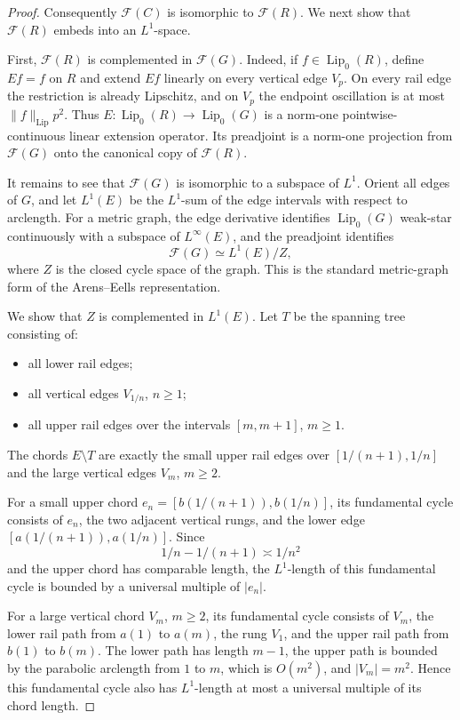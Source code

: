 \documentclass[11pt]{article}
\newcommand{\F}{\mathcal F}
\newcommand{\Lip}{\operatorname{Lip}}
\begin{document}
\begin{proof}
Consequently \(\F(C)\) is isomorphic to \(\F(R)\).  We next show that \(\F(R)\) embeds into an \(L^1\)-space.

First, \(\F(R)\) is complemented in \(\F(G)\).  Indeed, if \(f\in\Lip_0(R)\), define \(Ef=f\) on \(R\) and extend \(Ef\) linearly on every vertical edge \(V_p\).  On every rail edge the restriction is already Lipschitz, and on \(V_p\) the endpoint oscillation is at most \(\|f\|_{\Lip}p^2\).  Thus \(E:\Lip_0(R)\to \Lip_0(G)\) is a norm-one pointwise-continuous linear extension operator.  Its preadjoint is a norm-one projection from \(\F(G)\) onto the canonical copy of \(\F(R)\).

It remains to see that \(\F(G)\) is isomorphic to a subspace of \(L^1\).  Orient all edges of \(G\), and let \(L^1(E)\) be the \(L^1\)-sum of the edge intervals with respect to arclength.  For a metric graph, the edge derivative identifies \(\Lip_0(G)\) weak-star continuously with a subspace of \(L^\infty(E)\), and the preadjoint identifies
\[
 \F(G)\simeq L^1(E)/Z,
\]
where \(Z\) is the closed cycle space of the graph.  This is the standard metric-graph form of the Arens--Eells representation.

We show that \(Z\) is complemented in \(L^1(E)\).  Let \(T\) be the spanning tree consisting of:
\begin{itemize}
\item all lower rail edges;
\item all vertical edges \(V_{1/n}\), \(n\geq 1\);
\item all upper rail edges over the intervals \([m,m+1]\), \(m\geq 1\).
\end{itemize}
The chords \(E\setminus T\) are exactly the small upper rail edges over \([1/(n+1),1/n]\) and the large vertical edges \(V_m\), \(m\geq 2\).

For a small upper chord \(e_n=[b(1/(n+1)),b(1/n)]\), its fundamental cycle consists of \(e_n\), the two adjacent vertical rungs, and the lower edge \([a(1/(n+1)),a(1/n)]\).  Since
\[
 1/n-1/(n+1)\asymp 1/n^2
\]
and the upper chord has comparable length, the \(L^1\)-length of this fundamental cycle is bounded by a universal multiple of \(|e_n|\).

For a large vertical chord \(V_m\), \(m\geq 2\), its fundamental cycle consists of \(V_m\), the lower rail path from \(a(1)\) to \(a(m)\), the rung \(V_1\), and the upper rail path from \(b(1)\) to \(b(m)\).  The lower path has length \(m-1\), the upper path is bounded by the parabolic arclength from \(1\) to \(m\), which is \(O(m^2)\), and \(|V_m|=m^2\).  Hence this fundamental cycle also has \(L^1\)-length at most a universal multiple of its chord length.


\end{proof}
\end{document}
